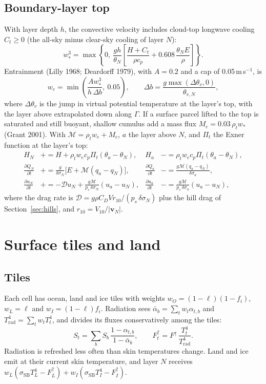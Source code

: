 \documentclass[11pt,a4paper]{article}
\newcommand{\pd}[2]{\frac{\partial #1}{\partial #2}}
\newcommand{\vect}[1]{\bm{#1}}
\begin{document}
\subsection{Boundary-layer top}
With layer depth $h$, the convective velocity includes cloud-top longwave cooling
$C_t \ge 0$ (the all-sky minus clear-sky cooling of layer $N$):
\begin{equation}
w_*^3 = \max\!\left\{0,\ \frac{gh}{\theta_N}\left[\frac{H + C_t}{\rho c_p}
   + 0.608\,\frac{\theta_N E}{\rho}\right]\right\}.
\end{equation}
Entrainment (Lilly 1968; Deardorff 1979), with $A = 0.2$ and a cap of
0.05\,m\,s$^{-1}$, is
\begin{equation}
w_e = \min\!\left(\frac{A w_*^3}{h\,\Delta b},\ 0.05\right), \qquad
\Delta b = \frac{g\max(\Delta\theta_v, 0)}{\theta_{v,N}},
\end{equation}
where $\Delta\theta_v$ is the jump in virtual potential temperature at the layer's
top, with the layer above extrapolated down along $\Gamma$. If a surface parcel
lifted to the top is saturated and still buoyant, shallow cumulus add a mass flux
$M_c = 0.03\,\rho_t w_*$ (Grant 2001). With $\mathcal{M} = \rho_t w_e + M_c$, $a$
the layer above $N$, and $\Pi_t$ the Exner function at the layer's top:
\begin{align}
H_N &\mathrel{+}= H + \rho_t w_e c_p\Pi_t(\theta_a - \theta_N), &
H_a &\mathrel{-}= \rho_t w_e c_p\Pi_t(\theta_a - \theta_N), \\
\pd{Q_N}{t} &\mathrel{+}= \frac{g}{\delta\sigma_N}\bigl[E + \mathcal{M}(q_a - q_N)\bigr], &
\pd{Q_a}{t} &\mathrel{-}= \frac{g\mathcal{M}(q_a - q_N)}{\delta\sigma_a}, \\
\pd{u_N}{t} &\mathrel{+}= -\mathcal{D}u_N + \frac{g\mathcal{M}}{p_s\,\delta\sigma_N}(u_a - u_N), &
\pd{u_a}{t} &\mathrel{-}= \frac{g\mathcal{M}}{p_s\,\delta\sigma_a}(u_a - u_N),
\end{align}
where the drag rate is $\mathcal{D} = g\rho C_D V r_{10}/(p_s\,\delta\sigma_N)$ plus
the hill drag of Section~\ref{sec:hills}, and $r_{10} = V_{10}/|\vect{v}_N|$.

\section{Surface tiles and land}

\subsection{Tiles}
Each cell has ocean, land and ice tiles with weights
$w_O = (1-\ell)(1-f_i)$, $w_L = \ell$ and $w_I = (1-\ell)f_i$. Radiation sees
$\bar\alpha_b = \sum_t w_t\alpha_{t,b}$ and $T_{\mathrm{rad}}^4 = \sum_t w_tT_t^4$, and
divides its fluxes conservatively among the tiles:
\begin{equation}
S_t = \sum_{b}S_b\,\frac{1-\alpha_{t,b}}{1-\bar\alpha_b}, \qquad
F^\uparrow_t = F^\uparrow\,\frac{T_t^4}{T_{\mathrm{rad}}^4}.
\end{equation}
Radiation is refreshed less often than skin temperatures change. Land and ice emit
at their current skin temperature, and layer $N$ receives
$w_L(\sigma_{\mathrm{SB}}T_L^4 - F^\uparrow_L) + w_I(\sigma_{\mathrm{SB}}T_I^4 - F^\uparrow_I)$.
\end{document}
